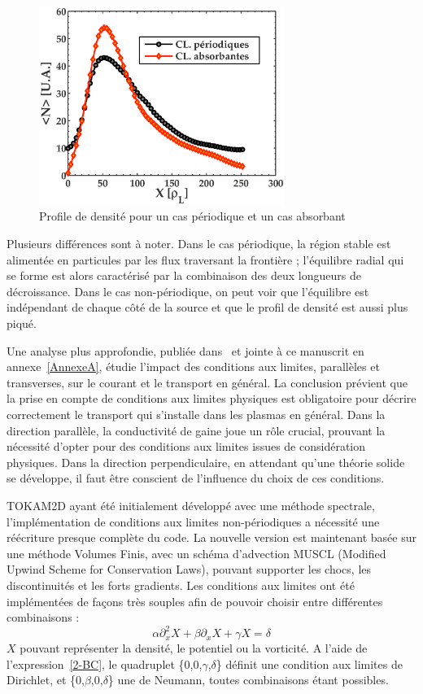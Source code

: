 \begin{refsection}
\begin{figure}[!htbp]
\centering
    \includegraphics[width=8cm]{figures/2-profileDenNoLimit.eps}
    \caption{Profile de densité pour un cas périodique et un cas
    absorbant\label{2-profileDenNoLimit}}
\end{figure}
	Plusieurs différences sont à noter. Dans le cas périodique, la région stable
	est alimentée en particules par les flux traversant la frontière ; l'équilibre radial qui se
	forme est alors caractérisé par la combinaison des deux longueurs de
	décroissance.
	Dans le cas non-périodique, on peut voir que l'équilibre est indépendant de
	chaque côté de la source et que le profil de densité est aussi plus piqué. 
	
	Une analyse plus approfondie, publiée dans~\parencite{Futtersack} et
	jointe à ce manuscrit en annexe~\ref{AnnexeA}, étudie l'impact des conditions
	aux limites, parallèles et transverses, sur le courant et le transport en général.
	La conclusion prévient que la prise en compte de conditions aux limites
	physiques est obligatoire pour décrire correctement le transport qui s'installe
	dans les plasmas en général. Dans la direction parallèle, la conductivité de
	gaine joue un rôle crucial, prouvant la nécessité d'opter pour des conditions
	aux limites issues de considération physiques. Dans la direction
	perpendiculaire, en attendant qu'une théorie solide se développe, il faut être
	conscient de l'influence du choix de ces conditions.
	
	TOKAM2D ayant été initialement
	développé avec une méthode spectrale, l'implémentation de conditions aux
	limites non-périodiques a nécessité une réécriture presque complète du code.
	La nouvelle version est maintenant basée sur une méthode Volumes Finis, avec un
	schéma d'advection MUSCL (Modified Upwind Scheme for Conservation Laws),
	pouvant supporter les chocs, les discontinuités et les forts gradients. Les
	conditions aux limites ont été implémentées de façons très souples afin de
	pouvoir choisir entre différentes combinaisons :
	\begin{equation}
	\label{2-BC}
		\alpha \partial^2_{x}X + \beta \partial_{x}X + \gamma X =
		\delta
	\end{equation}
	$X$ pouvant représenter la densité, le potentiel ou la vorticité. A l'aide de
	l'expression~\ref{2-BC}, le quadruplet \{0,0,$\gamma$,$\delta$\} définit une
	condition aux limites de Dirichlet, et \{0,$\beta$,0,$\delta$\} une de
	Neumann, toutes combinaisons étant possibles.
	

\end{refsection}
